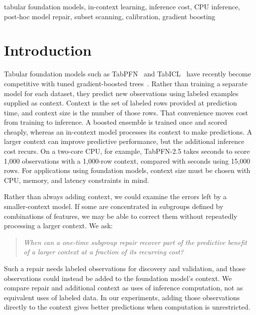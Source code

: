 \documentclass[conference]{IEEEtran}
\begin{document}
\begin{IEEEkeywords}
tabular foundation models, in-context learning, inference cost, CPU inference, post-hoc model repair,
subset scanning, calibration, gradient boosting
\end{IEEEkeywords}

\section{Introduction}\label{sec:intro}
Tabular foundation models such as TabPFN~\cite{hollmann2023tabpfn,hollmann2025nature,grinsztajn2025tabpfn25}
and TabICL~\cite{qu2025tabicl,qu2026tabiclv2} have recently become competitive with tuned
gradient-boosted trees~\cite{erickson2025tabarena,chen2016xgboost,prokhorenkova2018catboost}. Rather
than training a separate model for each dataset, they predict new observations using labeled examples
supplied as context. Context is the set of labeled rows provided at prediction time, and context size
is the number of those rows. That convenience moves cost from training to inference. A boosted
ensemble is trained once and scored cheaply, whereas an in-context model processes its context to make
predictions. A larger context can improve predictive performance, but the additional inference cost
recurs. On a two-core CPU, for example, TabPFN-2.5 takes \CpuSecOne{} seconds to score 1{,}000
observations with a 1{,}000-row context, compared with \CpuSecFull{} seconds using 15{,}000 rows. For
applications using foundation models, context size must be chosen with CPU, memory, and latency
constraints in mind.

Rather than always adding context, we could examine the errors left by a smaller-context model. If
some are concentrated in subgroups defined by combinations of features, we may be able to correct
them without repeatedly processing a larger context. We ask:
{\setlength{\topsep}{2pt}\setlength{\partopsep}{0pt}\begin{quote}
\itshape When can a one-time subgroup repair recover part of the predictive benefit of a
larger context at a fraction of its recurring cost?
\end{quote}}
Such a repair needs labeled observations for discovery and validation, and those observations could
instead be added to the foundation model's context. We compare repair and additional context as uses
of inference computation, not as equivalent uses of labeled data. In our experiments, adding those
observations directly to the context gives better predictions when computation is unrestricted.
\end{document}
